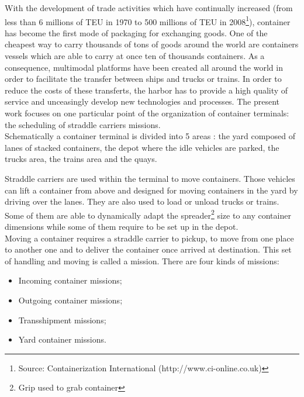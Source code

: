 \documentclass[a4paper,10pt]{article}
\begin{document}
With the development of trade activities which have continually increased (from less than 6 millions of TEU in 1970 to 500 millions of TEU in 2008\footnote{Source: Containerization International (http://www.ci-online.co.uk)}), container has become the first mode of packaging for exchanging goods. One of the cheapest way to carry thousands of tons of goods around the world are containers vessels which are able to carry at once ten of thousands containers. As a consequence, multimodal platforms have been created all around the world in order to facilitate the transfer between ships and trucks or trains. In order to reduce the costs of these transferts, the harbor has to provide a high quality of service and unceasingly develop new technologies and processes. The present work focuses on one particular point of the organization of container terminals: the scheduling of straddle carriers missions.\\

Schematically a container terminal is divided into 5 areas : the yard composed of lanes of stacked containers, the depot where the idle vehicles are parked, the trucks area, the trains area and the quays.

Straddle carriers are used within the terminal to move containers. Those vehicles can lift a container from above and designed for moving containers in the yard by driving over the lanes. They are also used to load or unload trucks or trains. Some of them are able to dynamically adapt the spreader\footnote{Grip used to grab container} size to any container dimensions while some of them require to be set up in the depot.\\%


Moving a container requires a straddle carrier to pickup, to move from one place to another one and to deliver the container once arrived at destination. This set of handling and moving is called a mission. There are four kinds of missions:
\begin{itemize}
	\item Incoming container missions;
	\item Outgoing container missions;
	\item Transshipment missions;
	\item Yard container missions.
\end{itemize}
\end{document}
